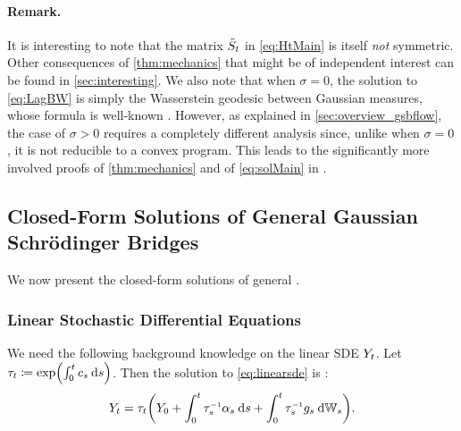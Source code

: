\paragraph{Remark.}
It is interesting to note that the matrix $\tilde{S}_{t}$ in \eqref{eq:HtMain} is itself \emph{not} symmetric. Other consequences of \cref{thm:mechanics} that might be of independent interest can be found in \cref{sec:interesting}. We also note that when $\sigma = 0$, the solution to \eqref{eq:LagBW} is simply the Wasserstein geodesic between Gaussian measures, whose formula is well-known \citep{dowson1982frechet, takatsu2010wasserstein}. However, as explained in \cref{sec:overview_gsbflow}, the case of $\sigma > 0$ requires a completely different analysis since, unlike when $\sigma = 0$, it is not reducible to a convex program. This leads to the significantly more involved proofs of \cref{thm:mechanics} and of \eqref{eq:solMain} in \citet{mallasto2021entropy}.

\subsection{Closed-Form Solutions of General Gaussian Schr\"odinger Bridges}
\label{sec:results_gsbflow}

We now present the closed-form solutions of general .

\subsubsection{Linear Stochastic Differential Equations}
\label{sec:linearsdes}

We need the following background knowledge on the linear \acrshort{SDE} $Y_{ t }$. Let $\aggtime \defeq \exp\parens*{  \int_0^\ctime \drift[\ctimealt] \dd \ctimealt}$. Then the solution to \eqref{eq:linearsde} is \citep{platen2010numerical}:
\begin{align}
\label{eq:linearsdesol}
\refsde = \aggtime  \parens*{\refsde[0] +  \int_0^\ctime  \aggtimeinv[\ctimealt]\shift[\ctimealt]  \dd \ctimealt + \int_0^\ctime {\aggtimeinv[\ctimealt]}{ \volat[\ctimealt] } \dWiener }.
\end{align}

